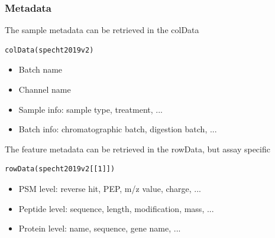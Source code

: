 \documentclass{beamer}
\newcommand{\hcode}[2][lgray]{{\ttfamily\color{vdgray}\colorbox{#1}{#2}}}
\newcommand{\frametitlesection}[1]{\frametitle{\centering #1 \footnotesize \hspace{0pt plus 1 filll} \insertsection}}
\begin{document}
\begin{frame}[fragile]
    \frametitlesection{Metadata}
    
    The sample metadata can be retrieved in the \hcode{colData}
    
    \begin{lstlisting}
colData(specht2019v2)
    \end{lstlisting}
    
    \begin{itemize}
        \item Batch name
        \item Channel name
        \item Sample info: sample type, treatment, ...
        \item Batch info: chromatographic batch, digestion batch, ...
    \end{itemize}
    
    \pause
    
    
    The feature metadata can be retrieved in the \hcode{rowData}, but assay 
    specific
    
    \begin{lstlisting}
rowData(specht2019v2[[1]])
    \end{lstlisting}
    
    \begin{itemize}
        \item PSM level: reverse hit, PEP, m/z value, charge, ...
        \item Peptide level: sequence, length, modification, mass, ...
        \item Protein level: name, sequence, gene name, ...
    \end{itemize}
    
    
\end{frame}
\end{document}
